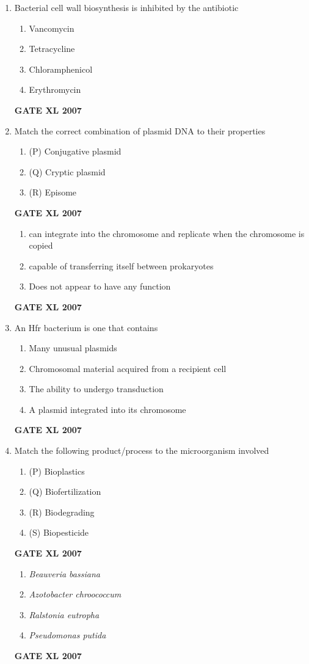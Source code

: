 \documentclass[journal,12pt,onecolumn]{IEEEtran}
\begin{document}
\begin{enumerate}
\item Bacterial cell wall biosynthesis is inhibited by the antibiotic
\begin{enumerate}
    \item Vancomycin
    \item Tetracycline
    \item Chloramphenicol
    \item Erythromycin
\end{enumerate}\hfill{\textbf{GATE XL 2007}}

\item Match the correct combination of plasmid DNA to their properties
\begin{enumerate}
    \item (P) Conjugative plasmid
    \item (Q) Cryptic plasmid
    \item (R) Episome
\end{enumerate}\hfill{\textbf{GATE XL 2007}}
\begin{enumerate}
    \item can integrate into the chromosome and replicate when the chromosome is copied
    \item capable of transferring itself between prokaryotes
    \item Does not appear to have any function
\end{enumerate}\hfill{\textbf{GATE XL 2007}}

\item An Hfr bacterium is one that contains
\begin{enumerate}
    \item Many unusual plasmids
    \item Chromosomal material acquired from a recipient cell
    \item The ability to undergo transduction
    \item A plasmid integrated into its chromosome
\end{enumerate}\hfill{\textbf{GATE XL 2007}}

\item Match the following product/process to the microorganism involved
\begin{enumerate}
    \item (P) Bioplastics
    \item (Q) Biofertilization
    \item (R) Biodegrading
    \item (S) Biopesticide
\end{enumerate}\hfill{\textbf{GATE XL 2007}}
\begin{enumerate}
    \item \textit{Beauveria bassiana}
    \item \textit{Azotobacter chroococcum}
    \item \textit{Ralstonia eutropha}
    \item \textit{Pseudomonas putida}
\end{enumerate}\hfill{\textbf{GATE XL 2007}}


\end{enumerate}
\end{document}
